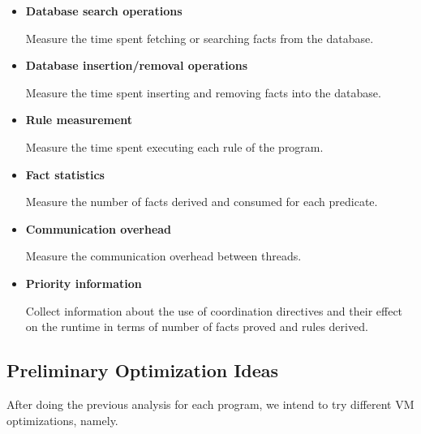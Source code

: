 \begin{itemize}
   \item \textbf{Database search operations}
   
   Measure the time spent fetching or searching facts from the database.
   
   \item \textbf{Database insertion/removal operations}
   
   Measure the time spent inserting and removing facts into the database.
   
   \item \textbf{Rule measurement}
   
   Measure the time spent executing each rule of the program.
   
   \item \textbf{Fact statistics}
   
   Measure the number of facts derived and consumed for each predicate.
   
   \item \textbf{Communication overhead}
   
   Measure the communication overhead between threads.

   \item \textbf{Priority information}

   Collect information about the use of coordination directives and their effect on the runtime in terms of number of facts proved and rules derived.
   
\end{itemize}

\subsection{Preliminary Optimization Ideas}

After doing the previous analysis for each \lang program, we intend to try different VM optimizations, namely.

